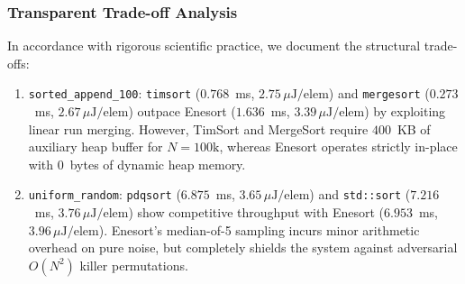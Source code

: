 \documentclass[journal]{IEEEtran}
\begin{document}
\subsubsection{Transparent Trade-off Analysis}
In accordance with rigorous scientific practice, we document the structural trade-offs:
\begin{enumerate}
    \item \texttt{sorted\_append\_100}: \texttt{timsort} ($0.768$~ms, $2.75\,\mu\text{J}/\text{elem}$) and \texttt{mergesort} ($0.273$~ms, $2.67\,\mu\text{J}/\text{elem}$) outpace Enesort ($1.636$~ms, $3.39\,\mu\text{J}/\text{elem}$) by exploiting linear run merging. However, TimSort and MergeSort require $400$~KB of auxiliary heap buffer for $N=100\text{k}$, whereas Enesort operates strictly in-place with 0~bytes of dynamic heap memory.
    \item \texttt{uniform\_random}: \texttt{pdqsort} ($6.875$~ms, $3.65\,\mu\text{J}/\text{elem}$) and \texttt{std::sort} ($7.216$~ms, $3.76\,\mu\text{J}/\text{elem}$) show competitive throughput with Enesort ($6.953$~ms, $3.96\,\mu\text{J}/\text{elem}$). Enesort's median-of-5 sampling incurs minor arithmetic overhead on pure noise, but completely shields the system against adversarial $O(N^2)$ killer permutations.
\end{enumerate}
\end{document}
